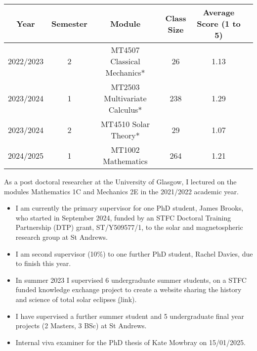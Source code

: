 \documentclass[11pt,a4paper]{article} %
\newcommand\vs{\vspace{-0.25cm}}
\begin{document}
\begin{center}
	\begin{tabular}{|c|c|c|c|c|c|}
		\hline
		Year & Semester & Module & Class Size & Average Score (1 to 5) \\ 
		\hline
		2022/2023 & 2 & MT4507 Classical Mechanics* & 26 & 1.13 \\ 
		\hline
		2023/2024 & 1 & MT2503 Multivariate Calculus* & 238 & 1.29 \\ 
		\hline
		2023/2024 & 2 & MT4510 Solar Theory* & 29 &  1.07 \\ 
		\hline
		2024/2025 & 1 & MT1002 Mathematics & 264 &  1.21 \\ 
		\hline
		
	\end{tabular}
\end{center}

\noindent As a post doctoral researcher at the University of Glasgow, I lectured on the modules Mathematics 1C and Mechanics 2E in the 2021/2022 academic year.

\vs
\begin{itemize}
	\item I am currently the primary supervisor for one PhD student, James Brooks, who started in September 2024, funded by an STFC Doctoral Training Partnership (DTP) grant, ST/Y509577/1, to the solar and magnetospheric research group at St Andrews.
	
	\vs
	\item I am second supervisor (10\%) to one further PhD student, Rachel Davies, due to finish this year.
	
	\vs
	\item In summer 2023 I supervised 6 undergraduate summer students, on a STFC funded knowledge exchange project to create a website sharing the history and science of total solar eclipses \href{https://eclipse-history.wp.st-andrews.ac.uk/}(link).
	\vs
	\item I have supervised a further summer student and 5 undergraduate final year projects (2 Masters, 3 BSc) at St Andrews.  
	\vs
	\item Internal viva examiner for the PhD thesis of Kate Mowbray on 15/01/2025.
\end{itemize}

\vs
\spacedhrule{0.5em}{-0.4em} %

\end{document}
